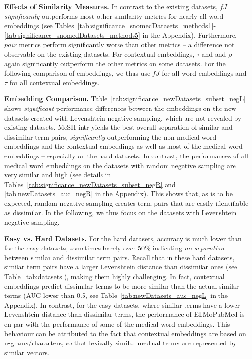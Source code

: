 \documentclass[letterpaper]{article} %
\begin{document}
\noindent\textbf{Effects of Similarity Measures.}
In contrast to the existing datasets, $fJ$ \emph{significantly} outperforms most other similarity metrics for nearly all word embeddings (see Tables~\ref{tab:significance_snomedDatasets_methods1}-\ref{tab:significance_snomedDatasets_methods5} in the Appendix).
Furthermore, $pair$ metrics perform significantly worse than other metrics -- a difference not observable on the existing datasets.
For contextual embeddings, $\tau$ and and $\rho$ again significantly outperform the other metrics on some datasets.
For the following comparison of embeddings, we thus use $fJ$ for all word embeddings and $\tau$ for all contextual embeddings.

\noindent\textbf{Embedding Comparison.}
Table~\ref{tab:significance_newDatasets_subset_negL} shows \emph{significant} performance differences between the embeddings on the new datasets created with Levenshtein negative sampling, which are not revealed by existing datasets.
MeSH intr yields the best overall separation of similar and dissimilar term pairs, \emph{significantly} outperforming the non-medical word embeddings and the contextual embeddings as well as most of the medical word embeddings -- especially on the hard datasets.
In contrast, the performances of all medical word embeddings on the datasets with random negative sampling are very similar and high (see details in Tables~\ref{tab:significance_newDatasets_subset_negR} and \ref{tab:newDatasets_auc_negR} in the Appendix).
This shows that, as is to be expected, random negative sampling creates term pairs that are easily identifiable as dissimilar.
In the following, we thus focus on the datasets with Levenshtein negative sampling.

\noindent\textbf{Easy vs. Hard Datasets.}
For the hard datasets, accuracy is much lower than for the easy datasets, sometimes barely over 50\% indicating \emph{no separation} between similar and dissimilar term pairs.
Recall that in these hard datasets, similar term pairs have a larger Levenshtein distance than dissimilar ones (see Table~\ref{tab:datasets}), making them highly challenging.
In fact, contextual embeddings predict dissimilar terms to be more similar than the actual similar terms (AUC lower than 0.5, see Table~\ref{tab:newDatasets_auc_negL} in the Appendix).
In contrast, for the easy datasets, where similar terms have a lower Levenshtein distance than dissimilar terms, the performance of ELMoPubMed is en par with the performance of some of the medical word embeddings.
This behaviour can be attributed to the fact that contextual embeddings are based on n-grams/characters, so that lexically similar medical terms are represented by similar vectors.
\end{document}
